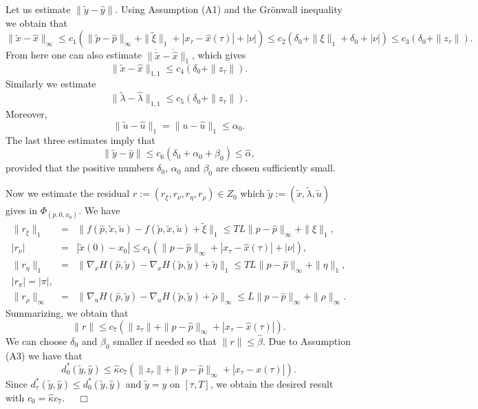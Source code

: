 \documentclass[10pt,a4paper]{amsart}
\renewenvironment{proof}[1]{\par\medskip\noindent\textbf{#1}\enspace\ignorespaces}{\par\medskip}
\newcommand{\al}{\alpha}
\newcommand{\bd}{\begin{displaymath}}
\newcommand{\bda}{\begin{eqnarray*}}
\newcommand{\ed}{\end{displaymath}}
\newcommand{\eda}{\end{eqnarray*}}
\renewenvironment{proof}[1]{%
\par\vspace{1\baselineskip}%
\noindent{\em Proof#1.\ \ }\ignorespaces }{%
\nobreak\hfill\mbox{\ \ $\Box$}%
\par\vspace{1\baselineskip}%
}
\begin{document}
\begin{proof}{}
Let us estimate $\| \tilde y - \hat y \|$. Using Assumption (A1) and the Gr\"{o}nwall inequality we obtain that 
\bd%
         \| \tilde x - \hat x \|_{\infty} \leq c_1 \left(\| \tilde p - \hat p \|_\infty + \| \tilde \xi \|_1  + 
         | x_\tau - \hat x(\tau) | + |\nu | \right) \leq
                 c_2 \left( \delta_0 + \| \xi \|_1 + \delta_0 + | \nu |\right) \leq c_3 (\delta_0 + \|  z_\tau \|).
\ed
From here one can also estimate $\| \dot{\tilde x} - \dot{\hat x} \|_1$, which gives
\bd
          \| \tilde x - \hat x \|_{1,1} \leq c_4 (\delta_0 + \|  z_\tau \|).
\ed
Similarly we estimate
\bd
              \| \tilde \lambda - \hat \lambda \|_{1,1} \leq c_5 (\delta_0 + \|  z_\tau \|).
\ed
Moreover, 
\bd
             \| \tilde u - \hat u\|_1 =  \| u - \hat u\|_1 \leq \al_0.
\ed
The last three estimates imply that 
\bd
               \| \tilde y - \hat y \| \leq c_6 (\delta_0 + \alpha_0 + \beta_0) \leq \hat \al,
\ed
provided that the positive numbers $\delta_0$, $\al_0$ and $\beta_0$ are chosen sufficiently small.

Now we estimate the residual $r := (r_\xi, r_\nu, r_\eta, r_\rho) \in Z_0$ 
which $\tilde y := (\tilde x, \tilde \lambda, \tilde u)$ gives in $\Phi_{(\hat p,0,x_0)}$. We have
\bda
              \| r_\xi \|_1 &=& \big\| f(\hat p, \tilde x, \tilde u) - f(\tilde p, \tilde x, \tilde u) + \tilde \xi \big\|_1
                  \leq  T L \| p - \hat p \|_\infty  + \| \xi \|_1, \\
              | r_\nu | &= & | \tilde x(0) - x_0 | \leq c_1( \| p - \hat p \|_\infty +  |x_\tau - \hat x(\tau)| + | \nu | ), \\
              \| r_\eta \|_1 &=&  \big\| \nabla_{\!\! x} H (\hat p, \tilde y) -  
                  \nabla_{\!\! x} H(\tilde p, \tilde y) + \tilde \eta \big\|_1 \leq  T L \| p - \hat p \|_\infty  + \| \eta \|_1, \\
                  |r_\pi| = |\pi|,\\ 
                \| r_\rho \|_\infty &=&  \| \nabla_{\!\! u} H (\hat p, \tilde y) -  
                  \nabla_{\!\! u} H(\tilde p, \tilde y) + \tilde \rho \|_\infty \leq  L \| p - \hat p \|_\infty  + \| \rho \|_\infty.
\eda
Summarizing, we obtain that 
\bd
               \| r \| \leq c_7 \left( \| z_\tau \| + \| p - \hat p \|_\infty + | x_\tau - \hat x(\tau) | \right).
\ed     
We can choose $\delta_0$ and $\beta_0$ smaller if needed so that $\|r\|\le\hat\beta$. Due to Assumption (A3) we have that
\bd
             d^*_0(\tilde y, \hat y) \leq \hat \kappa  c_7 \left( \| z_\tau \| + \| p - \hat p \|_\infty + | x_\tau - \hat x(\tau) | \right).
\ed
Since $d^*_\tau(\tilde y, \hat y) \leq d^*_0(\tilde y, \hat y)$ and $\tilde y = y$ on $[\tau,T]$, 
we obtain the desired result with $c_0 = \hat \kappa c_7$.
\end{proof}
\end{document}
